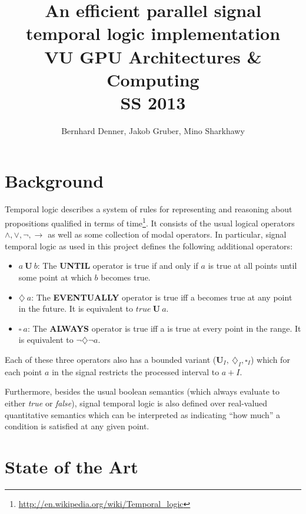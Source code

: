 \documentclass[a4paper,10pt]{article}
\title{
	An efficient parallel signal temporal logic implementation \\
    VU GPU Architectures \& Computing \\
    SS 2013
}
\author{
    Bernhard Denner,
    Jakob Gruber,
    Mino Sharkhawy
}
\renewcommand{\And}{\wedge}
\newcommand{\Or}{\vee}
\newcommand{\Neg}{\neg}
\newcommand{\Impl}{\rightarrow}
\newcommand{\Until}{\mathbf{U}}
\newcommand{\Evtl}{\diamondsuit}
\newcommand{\Alw}{\square}
\newcommand{\Buntil}{\mathbf{U}_I}
\newcommand{\Bevtl}{\diamondsuit_I}
\newcommand{\Balw}{\square_I}
\begin{document}
\begin{comment}
Problem statement, State of the art (semantics, ...), Sequential algorithms, Parallel ..., Test cases, benchmarks, How the project went, what we did.
\end{comment}

\maketitle
\pagebreak
\tableofcontents
\pagebreak

\section{Background}

Temporal logic describes a system of rules for representing and reasoning about propositions
qualified in terms of time\footnote{\url{http://en.wikipedia.org/wiki/Temporal_logic}}.
It consists of the usual logical operators $\And, \Or, \Neg, \Impl$ as well as
some collection of modal operators. In particular, signal temporal logic as used in this
project defines the following additional operators:

\begin{itemize}
\item $a \: \Until \: b$: The \textbf{UNTIL} operator is true if and only if $a$ is true
      at all points until some point at which $b$ becomes true.
\item $\Evtl \: a$: The \textbf{EVENTUALLY} operator is true iff a becomes true at any point
      in the future. It is equivalent to $\mathit{true} \: \Until \: a$.
\item $\Alw \: a$: The \textbf{ALWAYS} operator is true iff a is true at every point in the range.
      It is equivalent to $\neg \Evtl \neg a$.
\end{itemize}

Each of these three operators also has a bounded variant ($\Buntil, \: \Bevtl, \Balw$) which
for each point $a$ in the signal restricts the processed interval to $a + I$.

Furthermore, besides the usual boolean semantics (which always evaluate to either \textit{true} or
\textit{false}), signal temporal logic is also defined over real-valued quantitative semantics which
can be interpreted as indicating ``how much'' a condition is satisfied at any given point.

\section{State of the Art}
\end{document}

